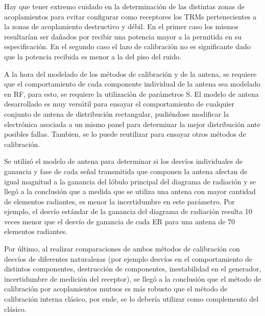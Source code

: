 Hay que tener extremo cuidado en la determinación de las distintas zonas de acoplamientos para evitar configurar como receptores
los TRMs pertenecientes a la zonas de acoplamiento destructivo y débil. En el primer caso los mismos resultarían ser dañados por
recibir una potencia mayor a la permitida en su especificación. En el segundo caso el lazo de calibración no es significante dado
que la potencia recibida es menor a la del piso del ruido. 

A la hora del modelado de los métodos de calibración y de la antena, se requiere que el comportamiento de cada componente 
individual de la antena sea modelado en RF, para esto, se requiere la utilización de parámetros S. El modelo de antena 
desarrollado es muy versátil para ensayar el comportamiento de cualquier conjunto de antena de distribución rectangular, 
pudiéndose modificar la electrónica asociada a un mismo panel para determinar la mejor distribución ante posibles fallas.
Tambien, se lo puede reutilizar para ensayar otros métodos de calibración.

Se utilizó el modelo de antena para determinar si los desvíos individuales de ganancia y fase de cada señal transmitida que 
componen la antena afectan de igual magnitud a la ganancia del lóbulo principal del diagrama de radiación y se llegó a la 
conclusión que a medida que se utiliza una antena con mayor cantidad de elementos radiantes, es menor la incertidumbre en este 
parámetro. Por ejemplo, el desvío estándar de la ganancia del diagrama de radiación resulta 10 veces menor que el desvío de 
ganancia de cada ER para una antena de 70 elementos radiantes.

Por último, al realizar comparaciones de ambos métodos de calibración con desvíos de diferentes naturalezas (por ejemplo desvíos
en el comportamiento de distintos componentes, destrucción de componentes, inestabilidad en el generador, incertidumbre de medición 
del receptor), se llegó a la conclusión que el método de calibración por acoplamientos mutuos es más robusto que el método de
calibración interna clásico, por ende, se lo debería utilizar como complemento del clásico.

